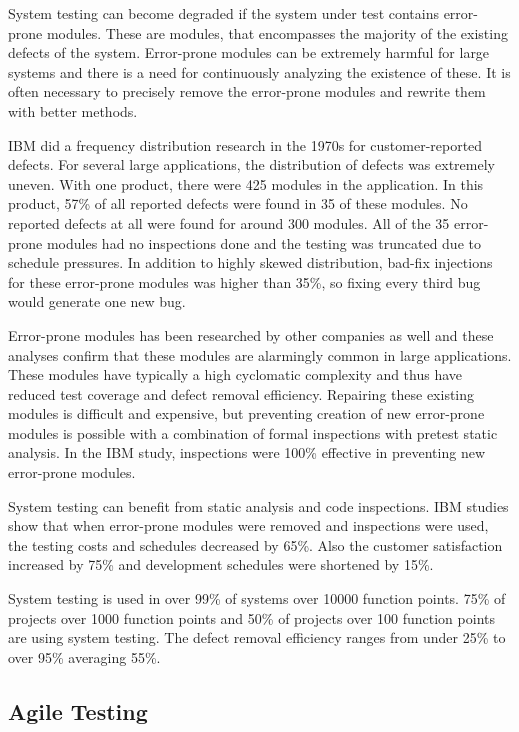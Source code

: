 System testing can become degraded if the system under test contains error-prone modules. These are modules, that encompasses the majority of the existing defects of the system. Error-prone modules can be extremely harmful for large systems and there is a need for continuously analyzing the existence of these. It is often necessary to precisely remove the error-prone modules and rewrite them with better methods.

IBM did a frequency distribution research in the 1970s for customer-reported defects. For several large applications, the distribution of defects was extremely uneven. With one product, there were 425 modules in the application. In this product, 57\% of all reported defects were found in 35 of these modules. No reported defects at all were found for around 300 modules. All of the 35 error-prone modules had no inspections done and the testing was truncated due to schedule pressures. In addition to highly skewed distribution, bad-fix injections for these error-prone modules was higher than 35\%, so fixing every third bug would generate one new bug.

Error-prone modules has been researched by other companies as well and these analyses confirm that these modules are alarmingly common in large applications. These modules have typically a high cyclomatic complexity and thus have reduced test coverage and defect removal efficiency. Repairing these existing modules is difficult and expensive, but preventing creation of new error-prone modules is possible with a combination of formal inspections with pretest static analysis. In the IBM study, inspections were 100\% effective in preventing new error-prone modules. 

System testing can benefit from static analysis and code inspections. IBM studies show that when error-prone modules were removed and inspections were used, the testing costs and schedules decreased by 65\%. Also the customer satisfaction increased by 75\% and development schedules were shortened by 15\%.

System testing is used in over 99\% of systems over 10000 function points. 75\% of projects over 1000 function points and 50\% of projects over 100 function points are using system testing. The defect removal efficiency ranges from under 25\% to over 95\% averaging 55\%.
 
 \subsection{Agile Testing}

